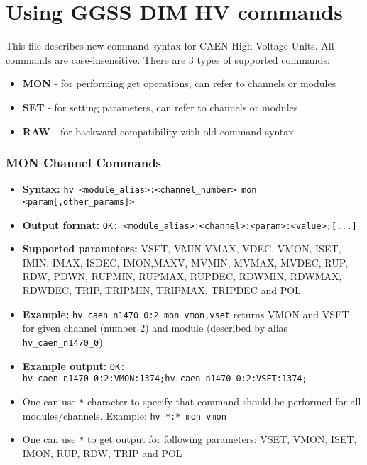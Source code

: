 \clearpage
\section{Using GGSS DIM HV commands}
This file describes new command syntax for CAEN High Voltage Units. All commands are case-insensitive. There are 3 types of supported commands:
\begin{itemize}
    \item \textbf{MON} - for performing get operations, can refer to channels or modules
    \item \textbf{SET} - for setting parameters, can refer to channels or modules
    \item \textbf{RAW} - for backward compatibility with old command syntax
\end{itemize}

\dotfill

\subsubsection*{MON Channel Commands}
\begin{itemize}
    \item \textbf{Syntax:} \lstinline{hv <module_alias>:<channel_number> mon <param[,other_params]>}
    \item \textbf{Output format:} \lstinline{OK: <module_alias>:<channel>:<param>:<value>;[...]}
    \item \textbf{Supported parameters:} VSET, VMIN VMAX, VDEC, VMON, ISET, IMIN, IMAX, ISDEC, IMON,MAXV, MVMIN, MVMAX, MVDEC, RUP, RDW, PDWN, RUPMIN, RUPMAX, RUPDEC, RDWMIN, RDWMAX, RDWDEC, TRIP, TRIPMIN, TRIPMAX, TRIPDEC and POL
    \item \textbf{Example:} \lstinline{hv_caen_n1470_0:2 mon vmon,vset} returns VMON and VSET for given channel (number 2) and module (described by alias \lstinline{hv_caen_n1470_0})
    \item \textbf{Example output:} \lstinline{OK: hv_caen_n1470_0:2:VMON:1374;hv_caen_n1470_0:2:VSET:1374;}
    \item One can use \lstinline{*} character to specify that command should be performed for all modules/channels. Example: \lstinline{hv *:* mon vmon}
    \item One can use \lstinline{*} to get output for following parameters: VSET, VMON, ISET, IMON, RUP, RDW, TRIP and POL
\end{itemize}

\dotfill

